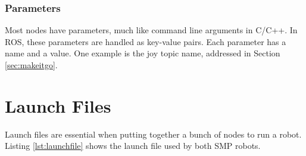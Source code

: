 \subsubsection{Parameters}

Most nodes have parameters, much like command line arguments in C/C++. In ROS, these parameters are handled as key-value pairs. Each parameter has a name and a value. One example is the joy topic name, addressed in Section \ref{sec:makeitgo}.

\section{Launch Files}
\label{sec:launchfiles}

Launch files are essential when putting together a bunch of nodes to run a robot. Listing \ref{lst:launchfile} shows the launch file used by both SMP robots.

